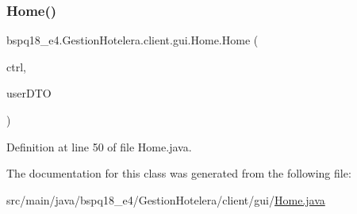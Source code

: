 \subsubsection{\texorpdfstring{Home()}{Home()}}
{\footnotesize\ttfamily bspq18\+\_\+e4.\+Gestion\+Hotelera.\+client.\+gui.\+Home.\+Home (\begin{DoxyParamCaption}\item[{\mbox{\hyperlink{classbspq18__e4_1_1_gestion_hotelera_1_1client_1_1controller_1_1_controller}{Controller}}}]{ctrl,  }\item[{\mbox{\hyperlink{classbspq18__e4_1_1_gestion_hotelera_1_1server_1_1dto_1_1_user_d_t_o}{User\+D\+TO}}}]{user\+D\+TO }\end{DoxyParamCaption})}



Definition at line 50 of file Home.\+java.



The documentation for this class was generated from the following file\+:\begin{DoxyCompactItemize}
\item 
src/main/java/bspq18\+\_\+e4/\+Gestion\+Hotelera/client/gui/\mbox{\hyperlink{_home_8java}{Home.\+java}}\end{DoxyCompactItemize}
